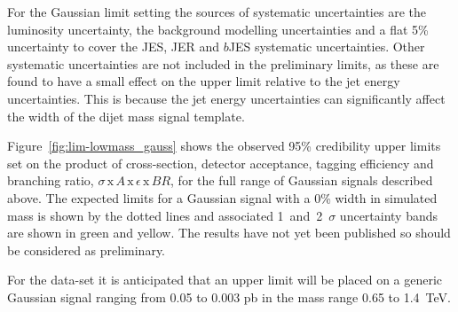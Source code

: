 \newpage
For the Gaussian limit setting the sources of systematic uncertainties
are the luminosity uncertainty,
the background modelling uncertainties and a flat 5\% uncertainty to cover
the JES, JER and $b$JES systematic uncertainties.
Other systematic uncertainties are not included in the preliminary limits,
as these are found to have a small effect on the upper limit relative to the jet energy uncertainties.
This is because the jet energy uncertainties can significantly affect the width of the dijet mass signal template.

Figure~\ref{fig:lim-lowmass_gauss} shows the observed 95\% credibility upper limits set 
on the product of cross-section, detector acceptance, tagging efficiency and branching ratio,
$\sigma\,\text{x}\,\mathit{A}\,\text{x}\,\epsilon\,\text{x}\,\mathit{BR}$,
for the full range of Gaussian signals described above.
The expected limits for a Gaussian signal with a 0\% width
in simulated mass is shown by the dotted lines and associated 1~and~2~$\sigma$ uncertainty bands
are shown in green and yellow.
The results have not yet been published so should be considered as preliminary.

For the \lm{} data-set it is anticipated that an upper limit will be placed
on a generic Gaussian signal ranging from 0.05 to 0.003 pb in the mass range 0.65 to 1.4~TeV.

